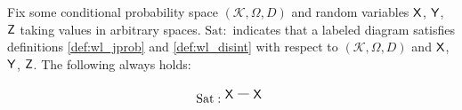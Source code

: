 \begin{lemma}

Fix some conditional probability space $(\mathscr{K},\Omega,D)$ and random variables $\mathsf{X}$, $\mathsf{Y}$, $\mathsf{Z}$ taking values in arbitrary spaces. $\mathrm{Sat:}$ indicates that a labeled diagram satisfies definitions \ref{def:wl_jprob} and \ref{def:wl_disint} with respect to $(\mathscr{K},\Omega,D)$ and $\mathsf{X}$, $\mathsf{Y}$, $\mathsf{Z}$.  The following always holds:

\begin{align}
\mathrm{Sat:}
\begin{tikzpicture}
\path (0,0) node (A) {$\RV{X}$}
++(0.8,0) node (X) {$\RV{X}$};
\draw (A) -- (X);
\end{tikzpicture}
\end{align}


\end{lemma}
